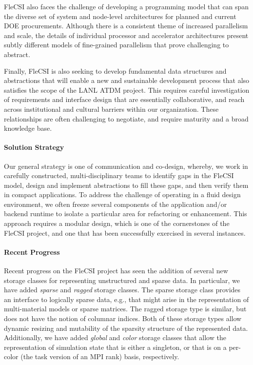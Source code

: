 FleCSI also faces the challenge of developing a programming model that
can span the diverse set of system and node-level architectures for
planned and current DOE procurements. Although there is a consistent
theme of increased parallelism and scale, the details of individual
processor and accelerator architectures present subtly different models
of fine-grained parallelism that prove challenging to abstract.

Finally, FleCSI is also seeking to develop fundamental data structures
and abstractions that will enable a new and sustainable development
process that also satisfies the scope of the LANL ATDM project. This
requires careful investigation of requirements and interface design that
are essentially collaborative, and reach across institutional and
cultural barriers within our organization. These relationships are often
challenging to negotiate, and require maturity and a broad knowledge
base.

\paragraph{Solution Strategy}


Our general strategy is one of communication and co-design, whereby, we
work in carefully constructed, multi-disciplinary teams to identify
gaps in the FleCSI model, design and implement abstractions to fill
these gaps, and then verify them in compact applications. To address
the challenge of operating in a fluid design environment, we often
freeze several components of the application and/or backend runtime to
isolate a particular area for refactoring or enhancement. This approach
requires a modular design, which is one of the cornerstones of the
FleCSI project, and one that has been successfully exercised in several
instances.

\paragraph{Recent Progress}

Recent progress on the FleCSI project has seen the addition of several
new storage classes for representing unstructured and sparse data. In
particular, we have added \textit{sparse} and \textit{ragged} storage
classes. The sparse storage class provides an interface to logically
sparse data, e.g., that might arise in the representation of
multi-material models or sparse matrices. The ragged storage type is
similar, but does not have the notion of columnar indices. Both of these
storage types allow dynamic resizing and mutability of the sparsity
structure of the represented data. Additionally, we have added
\textit{global} and \textit{color} storage classes that allow the
representation of simulation state that is either a singleton, or that
is on a per-color (the task version of an MPI rank) basis, respectively.

